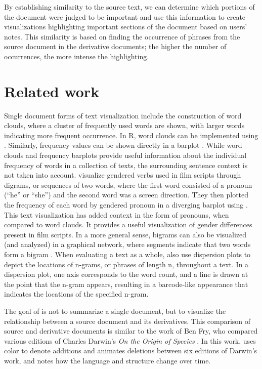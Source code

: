 By establishing similarity to the source text, we can determine which portions of the document were judged to be important and use this information to create visualizations highlighting important sections of the document based on users' notes.
This similarity is based on finding the occurrence of phrases from the source document in the derivative documents; the higher the number of occurrences, the more intense the highlighting.

\section{Related work}\label{related-work}

Single document forms of text visualization include the construction of word clouds, where a cluster of frequently used words are shown, with larger words indicating more frequent occurrence.
In R, word clouds can be implemented using  \citep{wordcloud}.
Similarly, frequency values can be shown directly in a barplot \citep{shibuya_mining_2015}.
While word clouds and frequency barplots provide useful information about the individual frequency of words in a collection of texts, the surrounding sentence context is not taken into account.
\citet{silge_she_nodate} visualize gendered verbs used in film scripts through digrams, or sequences of two words, where the first word consisted of a pronoun (``he'' or ``she'') and the second word was a screen direction.
They then plotted the frequency of each word by gendered pronoun in a diverging barplot using  \citep{ggplot2}.
This text visualization has added context in the form of pronouns, when compared to word clouds.
It provides a useful visualization of gender differences present in film scripts.
In a more general sense, bigrams can also be visualized (and analyzed) in a graphical network, where segments indicate that two words form a bigram \citep{shibuya_mining_2015}.
When evaluating a text as a whole, \citet{shibuya_mining_2015} also use dispersion plots to depict the locations of n-grams, or phrases of length n, throughout a text.
In a dispersion plot, one axis corresponds to the word count, and a line is drawn at the point that the n-gram appears, resulting in a barcode-like appearance that indicates the locations of the specified n-gram.

The goal of  is not to summarize a single document, but to visualize the relationship between a source document and its derivatives.
This comparison of source and derivative documents is similar to the work of Ben Fry, who compared various editions of Charles Darwin's \emph{On the Origin of Species} \citep{fryTracingOrigin2018}.
In this work, \citet{fryTracingOrigin2018} uses color to denote additions and animates deletions between six editions of Darwin's work, and notes how the language and structure change over time.

